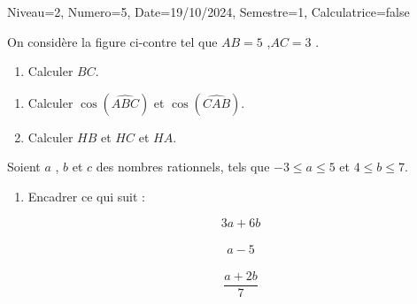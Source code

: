 \documentclass[a4paper,12pt]{article}
\begin{document}
\begin{Maquette}[DS]{Niveau=2, Numero=5, Date=19/10/2024, Semestre=1, Calculatrice=false}

\begin{exercice}
\begin{minipage}{.65\linewidth}
On considère la figure ci-contre tel que $AB=5$ ,$AC=3$ .
\begin{enumerate}
\item{} Calculer  $BC$.

\anserline[4]
\end{enumerate}
\end{minipage}
\begin{minipage}{.35\linewidth}
\end{minipage}
\begin{enumerate}
\item{} Calculer $\cos(\widehat{ABC})$ et $\cos(\widehat{CAB})$.
\begin{multicols}{2}
\anserline[2]
\columnbreak

\anserline[2]
\end{multicols}
\item{} Calculer $HB$ et $HC$ et $HA$.
\begin{multicols}{3}
\anserline[3]
\columnbreak

\anserline[3]
\columnbreak

\anserline[3]
\end{multicols}
\end{enumerate}
\end{exercice}

\begin{exercice}
Soient $a$ , $b$ et $c$ des nombres rationnels, tels que $-3\leq a \leq 5$ et $4\leq b \leq 7$.
\begin{enumerate}
\item{} Encadrer ce qui suit :\vspace{-1cm}
\begin{multicols}{3}
\[3a+6b\]\\ \anserline[3]
\[a-5\]\\ \anserline[3]
\[\frac{a+2b}{7}\]\\ \anserline[3]
\end{multicols}
\end{enumerate}
\end{exercice}



\end{Maquette}
\end{document}
